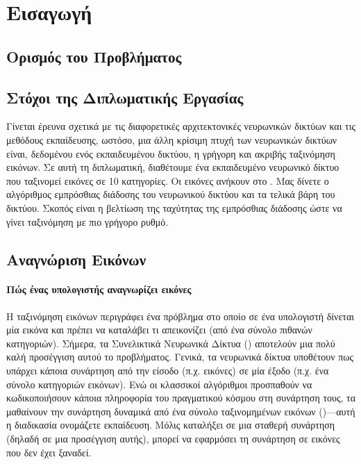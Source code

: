\chapter{Εισαγωγή}

\section{Ορισμός του Προβλήματος}

\section{Στόχοι της Διπλωματικής Εργασίας}
Γίνεται έρευνα σχετικά με τις διαφορετικές αρχιτεκτονικές νευρωνικών δικτύων και τις μεθόδους εκπαίδευσης, ωστόσο, μια άλλη κρίσιμη πτυχή των νευρωνικών δικτύων είναι, δεδομένου ενός εκπαιδευμένου δικτύου, η γρήγορη και ακριβής ταξινόμηση εικόνων. Σε αυτή τη διπλωματική, διαθέτουμε ένα εκπαιδευμένο νευρωνικό δίκτυο που ταξινομεί εικόνες  σε 10 κατηγορίες. Οι εικόνες ανήκουν στο \cite{cifar}. Μας δίνετε ο αλγόριθμος εμπρόσθιας διάδοσης του νευρωνικού δικτύου και τα τελικά βάρη του δικτύου. Σκοπός είναι η βελτίωση της ταχύτητας της εμπρόσθιας διάδοσης ώστε να γίνει ταξινόμηση με πιο γρήγορο ρυθμό.

\section*{Αναγνώριση Εικόνων}
\subsubsection{Πώς ένας υπολογιστής αναγνωρίζει εικόνες}
Η ταξινόμηση εικόνων περιγράφει ένα πρόβλημα στο οποίο σε ένα υπολογιστή δίνεται μία εικόνα και πρέπει να καταλάβει τι απεικονίζει (από ένα σύνολο πιθανών κατηγοριών).
Σήμερα, τα Συνελικτικά Νευρωνικά Δίκτυα () αποτελούν  μια πολύ καλή  προσέγγιση αυτού το προβλήματος. Γενικά, τα νευρωνικά δίκτυα υποθέτουν πως υπάρχει κάποια συνάρτηση από την είσοδο (π.χ. εικόνες) σε μία έξοδο (π.χ. ένα σύνολο κατηγοριών εικόνων). Ενώ οι κλασσικοί αλγόριθμοι προσπαθούν να κωδικοποιήσουν  κάποια πληροφορία του πραγματικού κόσμου στη συνάρτηση τους, τα  μαθαίνουν την συνάρτηση δυναμικά  από ένα σύνολο ταξινομημένων εικόνων ()—αυτή η διαδικασία ονομάζετε εκπαίδευση. Μόλις καταλήξει σε μια σταθερή συνάρτηση (δηλαδή σε μια προσέγγιση αυτής), μπορεί να εφαρμόσει τη συνάρτηση σε εικόνες που δεν έχει ξαναδεί.

